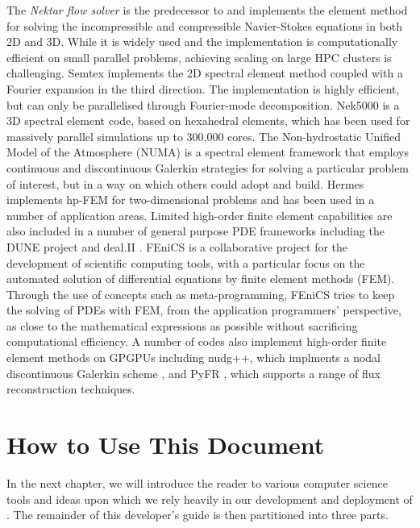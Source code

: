 The \emph{Nektar flow solver} is the predecessor to \nek{} and
implements the \shp{} element method for solving the incompressible
and compressible Navier-Stokes equations in both 2D and 3D. While it is widely
used and the implementation is computationally efficient on small parallel problems,
achieving scaling on large HPC clusters is challenging. Semtex \cite{BlSh04}
implements the 2D spectral element method coupled with a Fourier expansion in
the third direction. The implementation is highly efficient, but can only be
parallelised through Fourier-mode decomposition.
Nek5000 \cite{Nek5000} is a 3D spectral element code, based on hexahedral
elements, which has been used for massively parallel simulations up to 300,000
cores. The Non-hydrostatic Unified Model of the Atmosphere (NUMA) \cite{GiraldoKC13} is a spectral element framework that employs continuous 
and discontinuous Galerkin
strategies for solving a particular problem of interest, but in a way on which others could adopt and build.  
Hermes \cite{VeSoZi07} implements hp-FEM for two-dimensional problems and
has been used in a number of application areas. Limited high-order finite
element capabilities are also included in a number of general purpose PDE
frameworks including the DUNE project \cite{DeKlNoOh11} and deal.II
\cite{BaHaKa07}.
FEniCS \cite{FEniCS} is a collaborative project for the development of scientific computing tools, with a particular focus 
on the automated solution of differential equations by finite element methods (FEM).  Through the use of concepts such as meta-programming,
FEniCS tries to keep the solving of PDEs with FEM, from the application programmers' perspective, as close to the mathematical expressions
as possible without sacrificing computational efficiency.
A number of codes also implement high-order finite element methods on
GPGPUs including nudg++, which
implments a nodal discontinuous Galerkin scheme \cite{HeWa07}, and PyFR
\cite{WiFaVi14}, which supports a range of flux reconstruction techniques.

\section{How to Use This Document}

In the next chapter, we will introduce the reader to various computer science tools and ideas upon which we rely heavily in our development and deployment of {\nek}.  The remainder of this developer's guide is then partitioned into three parts.

